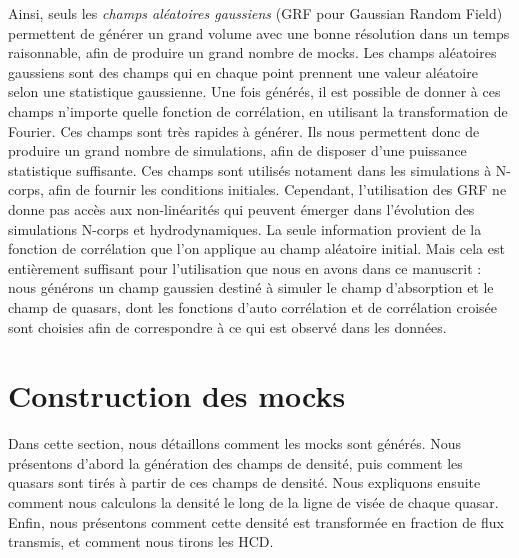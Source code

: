 Ainsi, seuls les \emph{champs aléatoires gaussiens} (GRF pour Gaussian Random Field) permettent de générer un grand volume avec une bonne résolution dans un temps raisonnable, afin de produire un grand nombre de mocks.
Les champs aléatoires gaussiens sont des champs qui en chaque point prennent une valeur aléatoire selon une statistique gaussienne.
Une fois générés, il est possible de donner à ces champs n'importe quelle fonction de corrélation, en utilisant la transformation de Fourier.
Ces champs sont très rapides à générer. Ils nous permettent donc de produire un grand nombre de simulations, afin de disposer d'une puissance statistique suffisante.
Ces champs sont utilisés notament dans les simulations à N-corps, afin de fournir les conditions initiales.
Cependant, l'utilisation des GRF ne donne pas accès aux non-linéarités qui peuvent émerger dans l'évolution des simulations N-corps et hydrodynamiques. La seule information provient de la fonction de corrélation que l'on applique au champ aléatoire initial.
Mais cela est entièrement suffisant pour l'utilisation que nous en avons dans ce manuscrit : nous générons un champ gaussien destiné à simuler le champ d'absorption \lya{} et le champ de quasars, dont les fonctions d'auto corrélation et de corrélation croisée sont choisies afin de correspondre à ce qui est observé dans les données.


\section{Construction des mocks}
Dans cette section, nous détaillons comment les mocks sont générés.
Nous présentons d'abord la génération des champs de densité,
puis comment les quasars sont tirés à partir de ces champs de densité.
Nous expliquons ensuite comment nous calculons la densité le long de la ligne de visée de chaque quasar.
Enfin, nous présentons comment cette densité est transformée en fraction de flux transmis, et comment nous tirons les HCD.


